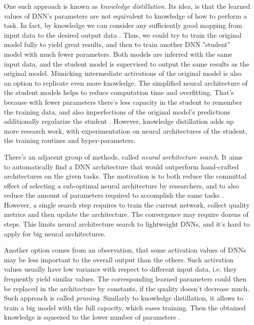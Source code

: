 One such approach is known as \textit{knowledge distillation}. Its idea, is that the learned values of DNN's parameters are not equivalent to knowledge of how to perform a task. In fact, by knowledge we can consider any sufficiently good mapping from input data to the desired output data \cite{method:distillation15}. Thus, we could try to train the original model fully to yield great results, and then to train another DNN "student" model with much fewer parameters. Both models are inferred with the same input data, and the student model is supervised to output the same results as the original model. Mimicking intermediate activations of the original model is also an option to replicate even more knowledge. The simplified neural architecture of the student models helps to reduce computation time and overfitting. That's because with fewer parameters there's less capacity in the student to remember the training data, and also imperfections of the original model's predictions additionally regularize the student \cite{survey:distillation21, speed:distillgan19}. However, knowledge distillation adds up more research work, with experimentation on neural architectures of the student, the training routines and hyper-parameters.

There's an adjacent group of methods, called \textit{neural architecture search}. It aims to automatically find a DNN architecture that would outperform hand-crafted architectures on the given tasks. The motivation is to both reduce the committal effect of selecting a sub-optimal neural architecture by researchers, and to also reduce the amount of parameters required to accomplish the same tasks \cite{survey:neural-arch-search19, dnn:eff-neural-arch-search18}. However, a single search step requires to train the current network, collect quality metrics and then update the architecture. The convergence may require dozens of steps. This limits neural architecture search to lightweight DNNs, and it's hard to apply for big neural architectures.

Another option comes from an observation, that some activation values of DNNs may be less important to the overall output than the others. Such activation values usually have low variance with respect to different input data, i.e. they frequently yield similar values. The corresponding learned parameters could then be replaced in the architecture by constants, if the quality doesn't decrease much. Such approach is called \textit{pruning}. Similarly to knowledge distillation, it allows to train a big model with the full capacity, which eases training. Then the obtained knowledge is squeezed to the lower number of parameters  \cite{method:pruning16, survey:pruning20, speed:prunning-gan21}.

